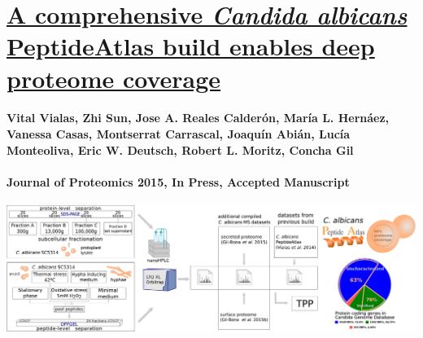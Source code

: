 %
%


\chapter*{\href{http://www.ncbi.nlm.nih.gov/pubmed/26493587}{A comprehensive \textit{Candida albicans} PeptideAtlas build enables deep proteome coverage}}





\subsubsection*{Vital Vialas, Zhi Sun, Jose A. Reales Calder\'on, Mar\'ia L. Hern\'aez, Vanessa Casas, Montserrat Carrascal, Joaqu\'in Abi\'an, Luc\'ia Monteoliva, Eric W. Deutsch, Robert L. Moritz, Concha Gil}
\subsubsection*{Journal of Proteomics 2015, In Press, Accepted Manuscript}

\bigskip
\hfill
\includegraphics[width=1\textwidth]{Imagenes/Vectorial/graphical_abstract_PeptideAtlas2}




\newpage



